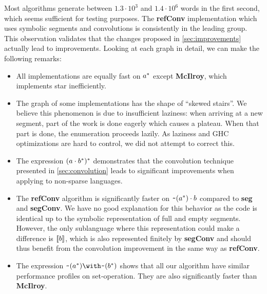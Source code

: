 Most algorithms generate between $1.3\cdot10^3$ and $1.4\cdot10^6$ words in the first
second, which seems sufficient for testing purposes.
The \textbf{refConv} implementation
which uses symbolic segments and convolutions is consistently in the
leading group.
This observation validates that the
changes proposed in \cref{sec:improvements} actually lead to
improvements.
%
Looking at each graph in detail, we can make the following
remarks:
\begin{itemize}[leftmargin=*]
\item All implementations are equally fast on $a^*$ except
  \textbf{McIlroy}, which implements star inefficiently.
\item The graph of some implementations
  has the shape of ``skewed stairs''. We believe this phenomenon is due to
  insufficient laziness: when arriving at a new segment, part of the
  work is done eagerly which causes a plateau. When that part is done,
  the enumeration proceeds lazily.  As laziness and GHC
  optimizations are hard to control, we did not attempt to correct this.
\item The expression $(a \cdot{b^*})^*$ demonstrates that
  the convolution technique presented in \cref{sec:convolution}
  leads to significant improvements when applying  to non-sparse languages.
\item The \textbf{refConv} algorithm is
  significantly faster on $\texttt{\textasciitilde}{(a^*)} \cdot{b}$
  compared to \textbf{seg} and \textbf{segConv}. We have no good
  explanation for this behavior as the code is identical up to the
  symbolic representation of full and empty segments. However, the
  only sublanguage where this representation could make a difference
  is $\llbracket b\rrbracket$, which is also represented finitely by
  \textbf{segConv} and should thus benefit from the convolution
  improvement in the same way as \textbf{refConv}.
\item The expression $\Rintersect{\Rcomplement{(\Rstar{a})}}{\Rcomplement{(\Rstar{b})}}$
  shows that all our algorithm have similar performance profiles on
  set-operation. They are also significantly faster than
  \textbf{McIlroy}.
\end{itemize}


